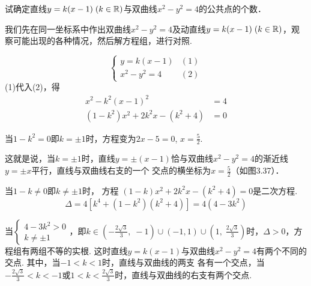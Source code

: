 \begin{example}
    试确定直线$y=k(x-1)\; (k\in\mathbb{R})$与双曲线$x^2-y^2=4$的公共点的个数．
\end{example}

\begin{analyze}
    我们先在同一坐标系中作出双曲线$x^2-y^2=4$及动直线$y=k(x-1)\; (k\in\mathbb{R})$，观察可能出现的各种情况，然后解方程组，进行对照.
\end{analyze}

\begin{solution}

\noindent
\begin{minipage}{.43\textwidth}\CTEXindent
\[\begin{cases}
    y=k(x-1) &(1)\\
    x^2-y^2=4&(2)
\end{cases}\]
(1)代入(2)，得
\[\begin{split}
    x^2-k^2(x-1)^2&=4\\
(1-k^2)x^2+2k^2x-(k^2+4)&=0
\end{split}\]

当$1-k^2=0$即$k=\pm 1$时，方程变为$2x-5=0$, 
$x=\frac{5}{2}$.
\end{minipage}
\hfill
\begin{minipage}{.55\textwidth}
\centering
{}
\end{minipage}


这就是说，当$k=\pm 1$时，直线$y=\pm (x-1)$恰与双曲线$x^2-y^2=4$的渐近线$y=\pm x$平行，直线与双曲线右支的一个
交点的横坐标为$x=\frac{5}{2}$（如图3.37）．

当$1-k\ne 0$即$k\ne \pm1$时，
方程
$(1-k)x^2+2k^2x-(k^2+4)=0$是二次方程.
\[\Delta =4[k^4+(1-k^2)(k^2+4)]=4(4-3k^2)\]

当$\begin{cases}
    4-3k^2>0\\ k\ne \pm 1
\end{cases}$，即$k\in\left(-\frac{2\sqrt{3}}{3},\; -1\right)\cup(-1,1)\cup\left(1,\;\frac{2\sqrt{3}}{3}\right)$时，$\Delta >0$，方
程组有两组不等的实根. 这时直线$y=k(x-1)$与双曲线$x^2-y^2=4$有两个不同的交点. 其中，当$-1<k<1$时，直线与双曲线的两支
各有一个交点，当$-\frac{2\sqrt{3}}{3}<k<-1$或$1<k<\frac{2\sqrt{3}}{3}$时，直线与双曲线的右支有两个交点.


\end{solution}
